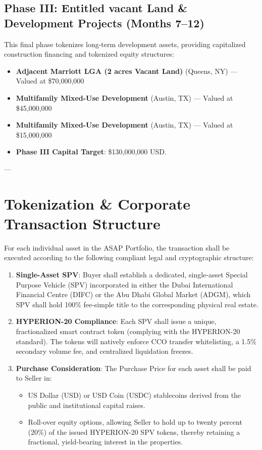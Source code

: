 \documentclass[11pt,a4paper]{article}
\begin{document}
\subsection{Phase III: Entitled vacant Land \& Development Projects (Months 7--12)}
This final phase tokenizes long-term development assets, providing capitalized construction financing and tokenized equity structures:
\begin{itemize}
    \item \textbf{Adjacent Marriott LGA (2 acres Vacant Land)} (Queens, NY) --- Valued at \$70,000,000
    \item \textbf{Multifamily Mixed-Use Development} (Austin, TX) --- Valued at \$45,000,000
    \item \textbf{Multifamily Mixed-Use Development} (Austin, TX) --- Valued at \$15,000,000
    \item \textbf{Phase III Capital Target}: \$130,000,000 USD.
\end{itemize}

---

\section{Tokenization \& Corporate Transaction Structure}
For each individual asset in the ASAP Portfolio, the transaction shall be executed according to the following compliant legal and cryptographic structure:
\begin{enumerate}
    \item \textbf{Single-Asset SPV}: Buyer shall establish a dedicated, single-asset Special Purpose Vehicle (SPV) incorporated in either the Dubai International Financial Centre (DIFC) or the Abu Dhabi Global Market (ADGM), which SPV shall hold 100\% fee-simple title to the corresponding physical real estate.
    \item \textbf{HYPERION-20 Compliance}: Each SPV shall issue a unique, fractionalized smart contract token (complying with the HYPERION-20 standard). The tokens will natively enforce CCO transfer whitelisting, a 1.5\% secondary volume fee, and centralized liquidation freezes.
    \item \textbf{Purchase Consideration}: The Purchase Price for each asset shall be paid to Seller in:
    \begin{itemize}
        \item US Dollar (USD) or USD Coin (USDC) stablecoins derived from the public and institutional capital raises.
        \item Roll-over equity options, allowing Seller to hold up to twenty percent (20\%) of the issued HYPERION-20 SPV tokens, thereby retaining a fractional, yield-bearing interest in the properties.
    \end{itemize}
\end{enumerate}
\end{document}
